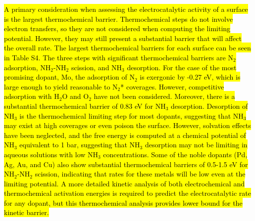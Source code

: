 


\hl{A primary consideration when assessing the electrocatalytic activity of a surface is the largest thermochemical barrier. Thermochemical steps do not involve electron transfers, so they are not considered when computing the limiting potential. However, they may still present a substantial barrier that will affect the overall rate. The largest thermochemical barriers for each surface can be seen in Table S4. The three steps with significant thermochemical barriers are N$_2$ adsorption, NH$_2$-NH$_2$ scission, and NH$_3$ desorption. For the case of the most promising dopant, Mo, 
the adsorption of N$_2$ is exergonic by -0.27 eV, which is large enough to yield reasonable to N$_2$* coverages. However, competitive adsorption with H$_2$O and O$_2$ have not been considered. Moreover, there is a substantial thermochemical barrier of 0.83 eV for NH$_3$ desorption. Desorption of NH$_3$ is the thermochemical limiting step for most dopants, suggesting that NH$_3$ may exist at high coverages or even poison the surface. However, solvation effects have been neglected, and the free energy is computed at a chemical potential of NH$_3$ equivalent to 1 bar, suggesting that NH$_3$ desorption may not be limiting in aqueous solutions with low NH$_3$ concentrations. Some of the noble dopants (Pd, Ag, Au, and Cu) also show substantial thermochemical barriers of 0.5-1.5 eV for NH$_2$-NH$_2$ scission, indicating that rates for these metals will be low even at the limiting potential. A more detailed kinetic analysis of both electrochemical and thermochemical activation energies is required to predict the electrocatalytic rate for any dopant, but this thermochemical analysis provides lower bound for the kinetic barrier.}

